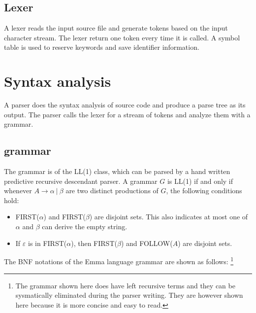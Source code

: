 \documentclass[10pt,a4paper]{article}
\begin{document}
\subsection{Lexer}
A lexer reads the input source file and generate tokens based on 
the input character stream. The lexer return one token every time
it is called. A symbol table is used to reserve keywords and save
identifier information.

\pagebreak


\section{Syntax analysis}
A parser does the syntax analysis of source code and produce a parse tree
as its output. The parser calls the lexer for a stream of tokens and 
analyze them with a grammar.

\subsection{grammar}
The grammar is of the LL(1) class, which can be parsed by a hand written 
predictive recursive descendant parser. 
A grammar $G$ is LL(1) if and only if whenever $A \rightarrow \alpha\ |\ \beta$ 
are two distinct productions of $G$, the following conditions hold:
\begin{itemize}
\item FIRST($\alpha$) and FIRST($\beta$) are disjoint sets. This also indicates
at most one of $\alpha$ and $\beta$ can derive the empty string.
\item If $\varepsilon$ is in FIRST($\alpha$), then FIRST($\beta$) and 
FOLLOW($A$) are disjoint sets.
\end{itemize}

The BNF notations of the Emma language grammar are shown as follows:
\footnote{
The grammar shown here does have left recursive terms and they
can be sysmatically eliminated during the parser writing. They
are however shown here because it is more concise and easy to
read.}
\end{document}
